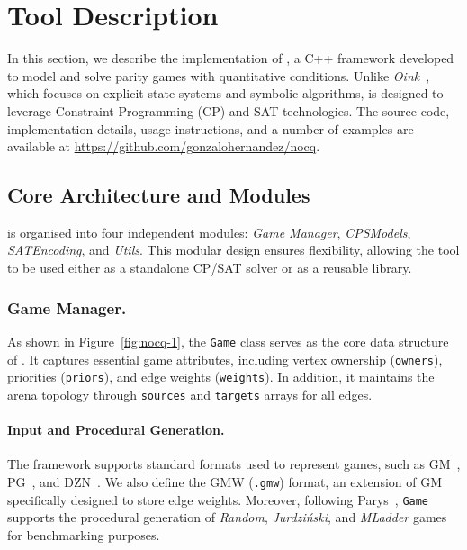 \documentclass[a4paper,UKenglish,cleveref, autoref, thm-restate, anonymous]{lipics-v2021}
\begin{document}
\section{Tool Description}

In this section, we describe the implementation of \nocq, a C++ framework developed to model and solve parity games with quantitative conditions. Unlike \emph{Oink}~\cite{vanDijk:2018}, which focuses on explicit-state systems and symbolic algorithms, \nocq is designed to leverage Constraint Programming (CP) and SAT technologies. The source code, implementation details, usage instructions, and a number of examples are available at \url{https://github.com/gonzalohernandez/nocq}.

\subsection*{Core Architecture and Modules}

\nocq is organised into four independent modules: \emph{Game Manager}, \emph{CPSModels}, \emph{SATEncoding}, and \emph{Utils}. This modular design ensures flexibility, allowing the tool to be used either as a standalone CP/SAT solver or as a reusable library.


\subsubsection*{Game Manager.}

As shown in Figure~\ref{fig:nocq-1}, the \texttt{Game} class serves as the core data structure of \nocq. It captures essential game attributes, including vertex ownership (\texttt{owners}), priorities (\texttt{priors}), and edge weights (\texttt{weights}). In addition, it maintains the arena topology through \texttt{sources} and \texttt{targets} arrays for all edges.

\paragraph{Input and Procedural Generation.}
The framework supports standard formats used to represent games, such as GM~\cite{Parys:2019}, PG~\cite{vanDijk:2018}, and DZN~\cite{Minizinc:2020}. We also define the GMW (\texttt{.gmw}) format, an extension of GM specifically designed to store edge weights.
%
Moreover, 
following Parys~\cite{Parys:2019}, \texttt{Game} supports the procedural generation of \emph{Random}, \emph{Jurdziński}, and \emph{MLadder} games for benchmarking purposes.
\end{document}
